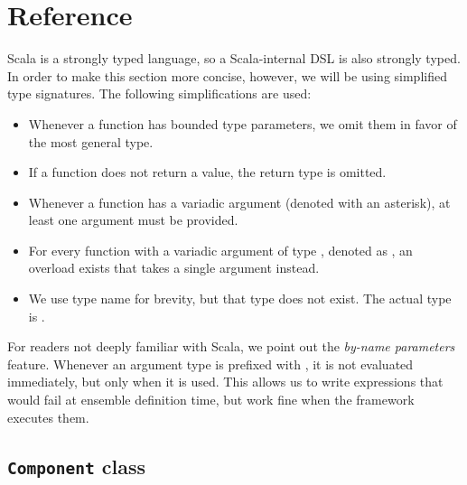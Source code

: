 \section{Reference}
\label{dsl:reference}

Scala is a strongly typed language, so a Scala-internal DSL is also strongly typed. In
order to make this section more concise, however, we will be using simplified type
signatures. The following simplifications are used:

\begin{itemize}
\item Whenever a function has bounded type parameters, we omit them in favor of the most
general type.
\item If a function does not return a value, the return type  is omitted.
\item Whenever a function has a variadic argument (denoted with an asterisk), at least
one argument must be provided.
\item For every function with a variadic argument of type , denoted as ,
an overload exists that takes a single  argument instead.
\item We use type name  for brevity, but that type does not exist. The actual
type is .
\end{itemize}

For readers not deeply familiar with Scala, we point out the \textit{by-name parameters}
feature. Whenever an argument type is prefixed with \dop{=>}, it is not evaluated
immediately, but only when it is used. This allows us to write expressions that would
fail at ensemble definition time, but work fine when the framework executes them.


\newenvironment{dslsig}%
    {%
        \par\vspace{0.6em}\bfseries\ttfamily\raggedright
    }%
    {%
        \vspace{-0.2em}
    }%

\newenvironment{dsldesc}%
    {%
        \nopagebreak
        \setlength{\parindent}{0em}
        \setlength{\parskip}{0.3em}
        \begin{adjustwidth}{1cm}{}
    }%
    {%
        \end{adjustwidth}
    }%


\subsection{\texttt{Component} class}
\label{dsl:r:component}

